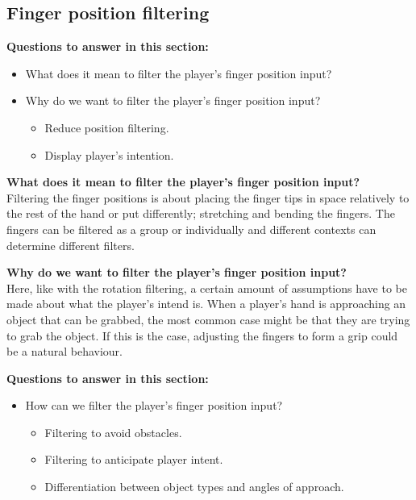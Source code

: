 \subsection{Finger position filtering}
\label{subsec:categoryFingerFiltering}
\textbf{Questions to answer in this section:}
\begin{itemize}
\item What does it mean to filter the player's finger position input?
\item Why do we want to filter the player's finger position input?
\begin{itemize}
\item Reduce position filtering.
\item Display player's intention.
\end{itemize}
\end{itemize}

\textbf{What does it mean to filter the player's finger position input?}\\
Filtering the finger positions is about placing the finger tips in space relatively to the rest of the hand or put differently; stretching and bending the fingers. The fingers can be filtered as a group or individually and different contexts can determine different filters.

\textbf{Why do we want to filter the player's finger position input?}\\
Here, like with the rotation filtering, a certain amount of assumptions have to be made about what the player's intend is. When a player's hand is approaching an object that can be grabbed, the most common case might be that they are trying to grab the object. If this is the case, adjusting the fingers to form a grip could be a natural behaviour.


\textbf{Questions to answer in this section:}
\begin{itemize}
\item How can we filter the player's finger position input?
\begin{itemize}
\item Filtering to avoid obstacles.
\item Filtering to anticipate player intent.
\item Differentiation between object types and angles of approach.
\end{itemize}
\end{itemize}


